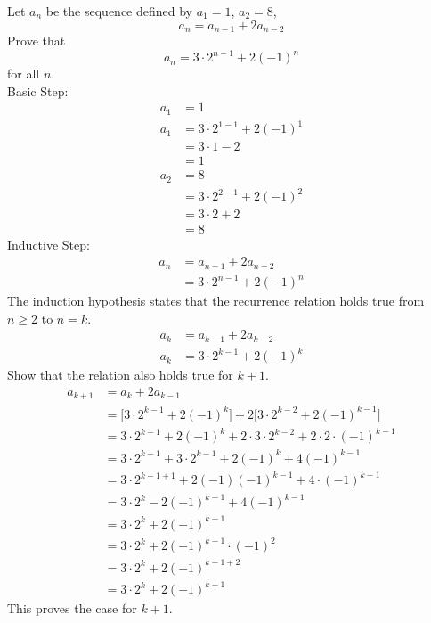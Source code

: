 \documentclass[12pt]{article}
\begin{document}
\begin{example} Let $a_n$ be the sequence defined by $a_1= 1$, $a_2 = 8$, $$a_{n} = a_{n - 1} + 2a_{n - 2} $$ Prove that $$a_n = 3 \cdot 2^{n - 1} + 2(-1)^n$$ for all $n$. \\
Basic Step: $$\begin{aligned} a_1 &= 1 \\ a_1 &= 3 \cdot 2^{1 - 1} + 2(-1)^1 \\ &= 3 \cdot 1 - 2 \\ &= 1 \\ 
a_2 &= 8 \\ &= 3 \cdot 2^{2 - 1} + 2(-1)^2 \\ &= 3 \cdot 2 + 2 \\ &= 8 \end{aligned} $$ 
Inductive Step: $$\begin{aligned} a_n &= a_{n - 1} + 2a_{n -2} \\ &= 3 \cdot 2^{n - 1} + 2(-1)^n \end{aligned} $$ 
The induction hypothesis states that the recurrence relation holds true from $n \geq 2$ to $n = k$. 
$$\begin{aligned} a_k &= a_{k - 1} + 2a_{k - 2} \\ a_k &= 3 \cdot 2 ^{k - 1} + 2(-1)^k \end{aligned} $$ 
Show that the relation also holds true for $k + 1$. $$\begin{aligned} 
a_{k + 1} &= a_k + 2a_{k - 1} \\ &= \Big[ 3 \cdot 2^{k - 1} + 2(-1)^k\Big] + 2\Big[3 \cdot 2^{k - 2} + 2(-1)^{k - 1}\Big] \\ &= 3 \cdot 2^{k - 1} + 2(-1)^k + 2 \cdot 3 \cdot 2^{k - 2} + 2 \cdot 2 \cdot (-1)^{k - 1} \\ &= 3 \cdot 2^{k - 1} + 3 \cdot 2^{k - 1} + 2(-1)^k + 4(-1)^{k - 1} \\ &= 3 \cdot 2^{k - 1 + 1} + 2(-1)(-1)^{k - 1} + 4 \cdot (-1)^{k - 1} \\ &= 3 \cdot 2^k - 2(-1)^{k - 1} + 4(-1)^{k - 1} \\ &= 3 \cdot 2^k + 2(-1)^{k - 1} \\ &= 3 \cdot 2^k + 2(-1)^{k - 1} \cdot (-1)^2 \\ &= 3 \cdot 2^k + 2(-1)^{k - 1 + 2} \\ &= 3 \cdot 2^k + 2(-1)^{k + 1} \end{aligned} $$ 
This proves the case for $k + 1$. \end{example} 
\end{document}
